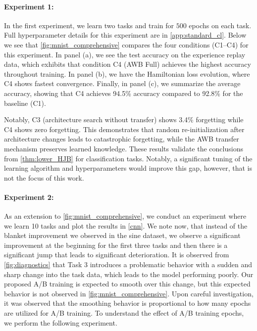 \paragraph{Experiment 1:} In the first experiment, we learn two tasks and train for $500$ epochs on each task. Full hyperparameter details for this experiment are in \cref{app:standard_cl}. Below we see that \cref{fig:mnist_comprehensive} compares the four conditions (C1--C4) for this experiment. In panel (a), we see the test accuracy on the experience replay data, which exhibits that condition C4 (AWB Full) achieves the highest accuracy throughout training. In panel (b), we have the Hamiltonian loss evolution, where C4 shows fastest convergence. Finally, in panel (c), we summarize the average accuracy, showing that C4 achieves 94.5\% accuracy compared to 92.8\% for the baseline (C1).

Notably, C3 (architecture search without transfer) shows 3.4\% forgetting while C4 shows zero forgetting. This demonstrates that random re-initialization after architecture changes leads to catastrophic forgetting, while the AWB transfer mechanism preserves learned knowledge. These results validate the conclusions from \cref{thm:lower_HJB} for classification tasks. Notably, a significant tuning of the learning algorithm and hyperparameters would improve this gap, however, that is not the focus of this work. 


\paragraph{Experiment 2:} As an extension to \cref{fig:mnist_comprehensive}, we conduct an experiment where we learn 10 tasks and plot the results in \cref{cnn}. We note now, that instead of the blanket improvement we observed in the sine dataset, we observe a significant improvement at the beginning for the first three tasks and then there is a significant jump that leads to significant deterioration. It is observed from \cref{fig:diagnostics} that Task 3 introduces a problematic behavior with a sudden and sharp change into the task data, which leads to the model performing poorly. Our proposed A/B training is expected to smooth over this change, but this expected behavior is not observed in \cref{fig:mnist_comprehensive}. Upon careful investigation, it was observed that the smoothing behavior is proportional to how many epochs are utilized for A/B training. To understand the effect of A/B training epochs, we perform the following experiment. 


